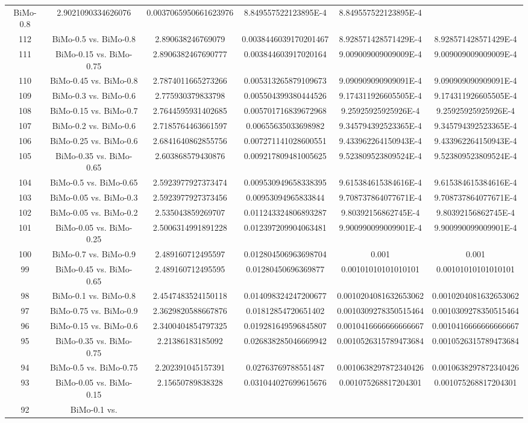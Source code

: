 \documentclass[a4paper,10pt]{article}
\begin{document}
\begin{landscape}
\begin{table}[!htp]
\begin{tabular}{cccccc}
BiMo-0.8&2.9021090334626076&0.0037065950661623976&8.849557522123895E-4&8.849557522123895E-4\\112&BiMo-0.5 vs. BiMo-0.8&2.890638246769079&0.0038446039170201467&8.928571428571429E-4&8.928571428571429E-4\\111&BiMo-0.15 vs. BiMo-0.75&2.8906382467690777&0.003844603917020164&9.009009009009009E-4&9.009009009009009E-4\\110&BiMo-0.45 vs. BiMo-0.8&2.7874011665273266&0.005313265879109673&9.090909090909091E-4&9.090909090909091E-4\\109&BiMo-0.3 vs. BiMo-0.6&2.775930379833798&0.005504399380444526&9.174311926605505E-4&9.174311926605505E-4\\108&BiMo-0.15 vs. BiMo-0.7&2.7644595931402685&0.005701716839672968&9.25925925925926E-4&9.25925925925926E-4\\107&BiMo-0.2 vs. BiMo-0.6&2.7185764463661597&0.00655635033698982&9.345794392523365E-4&9.345794392523365E-4\\106&BiMo-0.25 vs. BiMo-0.6&2.6841640862855756&0.007271141028600551&9.433962264150943E-4&9.433962264150943E-4\\105&BiMo-0.35 vs. BiMo-0.65&2.603868579430876&0.009217809481005625&9.523809523809524E-4&9.523809523809524E-4\\104&BiMo-0.5 vs. BiMo-0.65&2.5923977927373474&0.009530949658338395&9.615384615384616E-4&9.615384615384616E-4\\103&BiMo-0.05 vs. BiMo-0.3&2.5923977927373456&0.00953094965833844&9.708737864077671E-4&9.708737864077671E-4\\102&BiMo-0.05 vs. BiMo-0.2&2.535043859269707&0.011243324806893287&9.80392156862745E-4&9.80392156862745E-4\\101&BiMo-0.05 vs. BiMo-0.25&2.5006314991891228&0.012397209904063481&9.900990099009901E-4&9.900990099009901E-4\\100&BiMo-0.7 vs. BiMo-0.9&2.489160712495597&0.012804506963698704&0.001&0.001\\99&BiMo-0.45 vs. BiMo-0.65&2.489160712495595&0.01280450696369877&0.00101010101010101&0.00101010101010101\\98&BiMo-0.1 vs. BiMo-0.8&2.4547483524150118&0.014098324247200677&0.0010204081632653062&0.0010204081632653062\\97&BiMo-0.75 vs. BiMo-0.9&2.3629820588667876&0.01812854720651402&0.0010309278350515464&0.0010309278350515464\\96&BiMo-0.15 vs. BiMo-0.6&2.3400404854797325&0.019281649596845807&0.0010416666666666667&0.0010416666666666667\\95&BiMo-0.35 vs. BiMo-0.75&2.21386183185092&0.026838285046669942&0.0010526315789473684&0.0010526315789473684\\94&BiMo-0.5 vs. BiMo-0.75&2.202391045157391&0.02763769788551487&0.0010638297872340426&0.0010638297872340426\\93&BiMo-0.05 vs. BiMo-0.15&2.15650789838328&0.031044027699615676&0.001075268817204301&0.001075268817204301\\92&BiMo-0.1 vs. 
\end{tabular}
\end{table}
\end{landscape}
\end{document}
